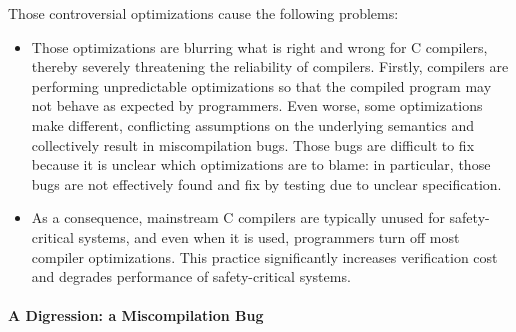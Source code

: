 

Those controversial optimizations cause the following problems:
%
\begin{itemize}
\item Those optimizations are blurring what is right and wrong for C compilers, thereby severely
  threatening the reliability of compilers.  Firstly, compilers are performing unpredictable
  optimizations so that the compiled program may not behave as expected by programmers.  Even worse,
  some optimizations make different, conflicting assumptions on the underlying semantics and
  collectively result in miscompilation bugs.  Those bugs are difficult to fix because it is unclear
  which optimizations are to blame: in particular, those bugs are not effectively found and fix by
  testing due to unclear specification.

\item As a consequence, mainstream C compilers are typically unused for safety-critical systems, and
  even when it is used, programmers turn off most compiler optimizations.  This practice
  significantly increases verification cost and degrades performance of safety-critical systems.
\end{itemize}




\paragraph{A Digression: a Miscompilation Bug}

